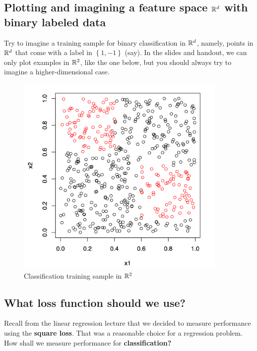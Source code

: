   \subsection{Plotting and imagining a feature space $\mathbb{R}^d$ with binary labeled data}

  Try to imagine a training sample for binary classification in $\mathbb{R}^d$,
  namely, points in $\mathbb{R}^d$ that come with a label in $\left\{ 1,-1
  \right\}$ (say). 
  In the slides and handout, we can only plot examples in $\mathbb{R}^2$, like the
  one below, but you
  should always try to imagine a higher-dimensional case.
  
  \begin{figure}[h!]
      \centering
      \includegraphics[width=4in]{tree1}
      \caption{Classification training sample in $\mathbb{R}^2$}
    \end{figure}
 
   

  \subsection{What loss function should we use?}

  Recall from the linear regression lecture that we decided to measure
  performance using the {\bf square loss}. That was a reasonable choice for a
  regression problem. How shall we measure performance for {\bf classification?}

